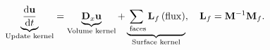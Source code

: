 \documentclass[compress]{beamer}
\newcommand{\td}[2]{\frac{{\rm d}#1}{{\rm d}#2}}
\newcommand{\LRp}[1]{\left( #1 \right)}
\begin{document}
{\begin{figure}
{%
}
\end{figure}
\[
\underbrace{\td{\mathbf{u}}{t}}_{\text{Update kernel}} = \underbrace{\mathbf{D}_x \mathbf{u}}_{\text{Volume kernel}} + \underbrace{\sum_{\text{ faces}}\mathbf{L}_f \LRp{\rm flux}}_{\text{Surface kernel}}, \quad \mathbf{L}_f = \mathbf{{M}}^{-1}\mathbf{{M}}_f.
\]


}
\end{document}
